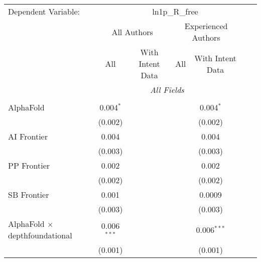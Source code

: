 \begingroup
\centering
\begin{tabular}{lcccccccc}
   \tabularnewline \midrule \midrule
   Dependent Variable: & \multicolumn{8}{c}{ln1p\_R\_free}\\
 & \multicolumn{3}{c}{All Authors} & \multicolumn{3}{c}{Experienced Authors} \\
\cmidrule(lr){2-4} \cmidrule(lr){5-7}
 & \multicolumn{1}{c}{All} & \multicolumn{2}{c}{With Intent Data} & \multicolumn{1}{c}{All} & \multicolumn{2}{c}{With Intent Data} \\
\cmidrule(lr){2-2} \cmidrule(lr){3-4} \cmidrule(lr){5-5} \cmidrule(lr){6-7}
 & \multicolumn{6}{c}{\textit{All Fields}} \\ \\
   AlphaFold                                      & 0.004$^{*}$   &              &       &       & 0.004$^{*}$   &              &       &   \\   
                                                  & (0.002)       &              &       &       & (0.002)       &              &       &   \\   
   AI Frontier                                    & 0.004         &              &       &       & 0.004         &              &       &   \\   
                                                  & (0.003)       &              &       &       & (0.003)       &              &       &   \\   
   PP Frontier                                    & 0.002         &              &       &       & 0.002         &              &       &   \\   
                                                  & (0.002)       &              &       &       & (0.002)       &              &       &   \\   
   SB Frontier                                    & 0.001         &              &       &       & 0.0009        &              &       &   \\   
                                                  & (0.003)       &              &       &       & (0.003)       &              &       &   \\   
   AlphaFold $\times$ depthfoundational           & 0.006$^{***}$ &              &       &       & 0.006$^{***}$ &              &       &   \\   
                                                  & (0.001)       &              &       &       & (0.001)       &              &       &   \\   

\end{tabular}
